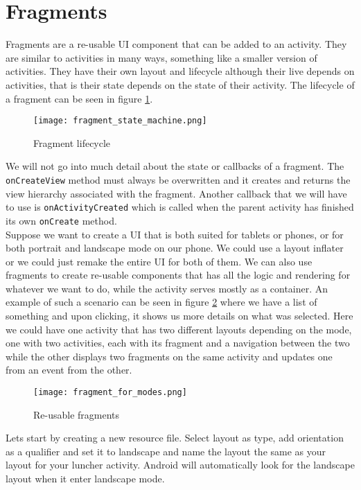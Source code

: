 \section{Fragments}
Fragments are a re-usable UI component that can be added to an activity. They are similar to activities in many ways, something like a smaller version of activities. They have their own layout and lifecycle although their live depends on activities, that is their state depends on the state of their activity. The lifecycle of a fragment can be seen in figure \ref{fig:flife}.

\begin{figure}[H]
\centering
\texttt{[image: fragment\_state\_machine.png]}
\caption{Fragment lifecycle}
\label{fig:flife}
\end{figure}

We will not go into much detail about the state or callbacks of a fragment. The \texttt{onCreateView} method must always be overwritten and it creates and returns the view hierarchy associated with the fragment. Another callback that we will have to use is \texttt{onActivityCreated} which is called when the parent activity has finished its own \texttt{onCreate} method.\\

Suppose we want to create a UI that is both suited for tablets or phones, or for both portrait and landscape mode on our phone. We could use a layout inflater or we could just remake the entire UI for both of them. We can also use fragments to create re-usable components that has all the logic and rendering for whatever we want to do, while the activity serves mostly as a container. An example of such a scenario can be seen in figure \ref{fig:freuse} where we have a list of something and upon clicking, it shows us more details on what was selected. Here we could have one activity that has two different layouts depending on the mode, one with two activities, each with its fragment and a navigation between the two while the other displays two fragments on the same activity and updates one from an event from the other.

\begin{figure}[H]
\centering
\texttt{[image: fragment\_for\_modes.png]}
\caption{Re-usable fragments}
\label{fig:freuse}
\end{figure}

Lets start by creating a new resource file. Select layout as type, add orientation as a qualifier and set it to landscape and name the layout the same as your layout for your luncher activity. Android will automatically look for the landscape layout when it enter landscape mode.\\

